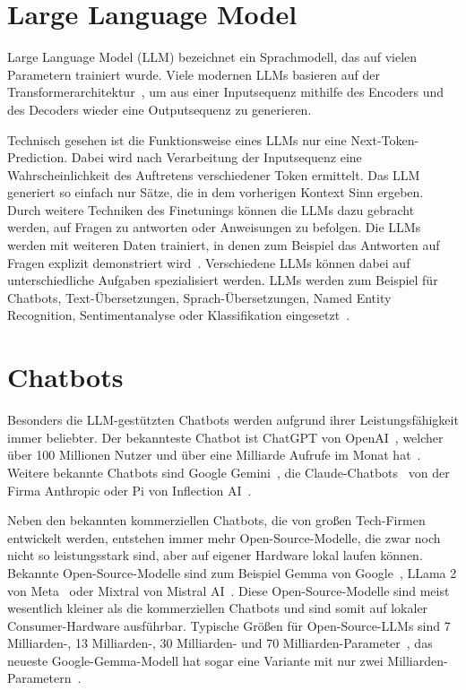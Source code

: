 \section{Large Language Model}

Large Language Model (LLM) bezeichnet ein Sprachmodell, das auf vielen Parametern trainiert wurde.
Viele modernen LLMs basieren auf der Transformerarchitektur~\cite{patwardhan2023}, um aus einer Inputsequenz mithilfe des Encoders und des Decoders wieder eine Outputsequenz zu generieren.

Technisch gesehen ist die Funktionsweise eines LLMs nur eine Next-Token-Prediction.
Dabei wird nach Verarbeitung der Inputsequenz eine Wahrscheinlichkeit des Auftretens verschiedener Token ermittelt.
Das LLM generiert so einfach nur Sätze, die in dem vorherigen Kontext Sinn ergeben.
Durch weitere Techniken des Finetunings können die LLMs dazu gebracht werden, auf Fragen zu antworten oder Anweisungen zu befolgen.
Die LLMs werden mit weiteren Daten trainiert, in denen zum Beispiel das Antworten auf Fragen explizit demonstriert wird~\cite{ouyang}.
Verschiedene LLMs können dabei auf unterschiedliche Aufgaben spezialisiert werden.
LLMs werden zum Beispiel für Chatbots, Text-Übersetzungen, Sprach-Übersetzungen, Named Entity Recognition, Sentimentanalyse oder Klassifikation eingesetzt~\cite{patwardhan2023}.

\section{Chatbots}

Besonders die LLM-gestützten Chatbots werden aufgrund ihrer Leistungsfähigkeit immer beliebter.
Der bekannteste Chatbot ist ChatGPT von OpenAI~\cite{chatgpt}, welcher über 100 Millionen Nutzer und über eine Milliarde Aufrufe im Monat hat~\cite{tong2023}.
Weitere bekannte Chatbots sind Google Gemini~\cite{gemini}, die Claude-Chatbots~\cite{claude} von der Firma Anthropic oder Pi von Inflection AI~\cite{pi}.

Neben den bekannten kommerziellen Chatbots, die von großen Tech-Firmen entwickelt werden, entstehen immer mehr Open-Source-Modelle, die zwar noch nicht so leistungsstark sind, aber auf eigener Hardware lokal laufen können.
Bekannte Open-Source-Modelle sind zum Beispiel Gemma von Google~\cite{banks2024}, LLama 2 von Meta~\cite{touvron2023} oder Mixtral von Mistral AI~\cite{jiang2024}.
Diese Open-Source-Modelle sind meist wesentlich kleiner als die kommerziellen Chatbots und sind somit auf lokaler Consumer-Hardware ausführbar.
Typische Größen für Open-Source-LLMs sind 7 Milliarden-, 13 Milliarden-, 30 Milliarden- und 70 Milliarden-Parameter~\cite{touvron2023}, das neueste Google-Gemma-Modell hat sogar eine Variante mit nur zwei Milliarden-Parametern~\cite{banks2024}.

